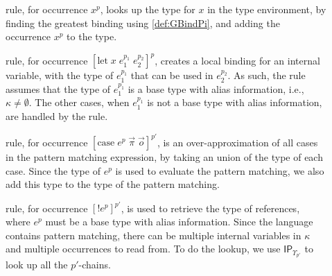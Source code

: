 \documentclass{llncs}
\newcommand{\IP}{\ensuremath{\textsf{IP}}\xspace}
\begin{document}
\begin{description}

	\item[] rule, for occurrence $x^p$, looks up the type for $x$ in the type environment, by finding the greatest binding using \cref{def:GBindPi}, and adding the occurrence $x^p$ to the type.

	\item[] rule, for occurrence $[\mbox{let}\;x\;e_1^{p_1}\;e_2^{p_2}]^p$, creates a local binding for an internal variable, with the type of $e_1^{p_1}$ that can be used in $e_2^{p_2}$.
     As such, the rule assumes that the type of $e_1^{p_1}$ is a base type with alias information, i.e., $\kappa\neq\emptyset$.
		The other cases, when $e_1^{p_1}$ is not a base type with alias information, are handled by the  rule.

	\item[] rule, for occurrence $[\mbox{case}\;e^{p}\;\vec{\pi}\;\vec{o}]^{p'}$, is an over-approximation of all cases in the pattern matching expression, by taking an union of the type of each case.
		Since the type of $e^p$ is used to evaluate the pattern matching, we also add this type to the type of the pattern matching.

	\item[] rule, for occurrence $[!e^{p}]^{p'}$, is used to retrieve the type of references, where $e^p$ must be a base type with alias information.
     Since the language contains pattern matching, there can be multiple internal variables in $\kappa$ and multiple occurrences to read from.
     To do the lookup, we use $\IP_{\Upsilon_{p'}}$ to look up all the $p'$-chains.
\end{description}
\end{document}
